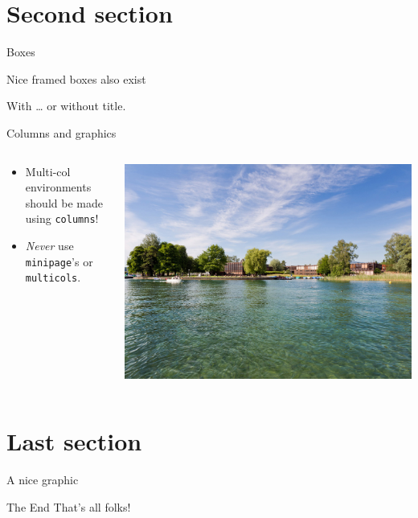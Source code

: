 \documentclass[aspectratio=43]{beamer}    %
\begin{document}
\section{Second section}
\begin{frame}{Boxes}
    \begin{HSRBox}{}
        Nice framed boxes also exist
    \end{HSRBox}
    \begin{HSRBox}{With \dots}
        or without title.
    \end{HSRBox}
\end{frame}
\begin{frame}{Columns and graphics}
    \begin{columns}[onlytextwidth]
        \begin{column}{0.5\textwidth}
            \begin{itemize}
                \item Multi-col environments should be made using \texttt{columns}!
                \item \emph{Never} use \texttt{minipage}'s or \texttt{multicols}.
            \end{itemize}
        \end{column}
        \begin{column}{0.5\textwidth}
            \centering
            \includegraphics[width=0.8\linewidth]{backgrounds/2014/Titelbild_Sommer.jpg}
        \end{column}
    \end{columns}
\end{frame}

\section{Last section}
\begin{frame}{A nice graphic}
    \centering
    
\end{frame}
\begin{frame}{The End}
    \centering
    \LARGE That's all folks!
\end{frame}
\end{document}

